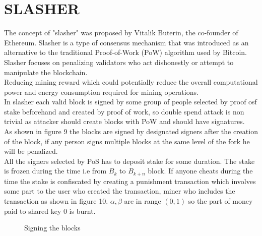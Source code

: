 \documentclass{article}
\begin{document}
\section{SLASHER}
The concept of "slasher" was proposed by Vitalik Buterin, the co-founder of Ethereum. Slasher is a type of consensus mechanism that was introduced as an alternative to the traditional Proof-of-Work (PoW) algorithm used by Bitcoin. Slasher focuses on penalizing validators who act dishonestly or attempt to manipulate the blockchain.\\
Reducing mining reward which could potentially reduce the overall computational power and energy consumption required for mining operations. \\
In slasher each valid block is signed by some group of people selected by proof osf stake beforehand and created by proof of work, so double spend attack is non trivial as attacker should create blocks with PoW and should have signatures. \\
As shown in figure 9 the blocks are signed by designated signers after the creation of the block, if any person signs multiple blocks at the same level of the fork he will be penalized. \\
All the signers selected by PoS has to deposit stake for some duration. The stake is frozen during the time i.e from $B_k$ to $B_{k+n}$ block. If anyone cheats during the time the stake is confiscated by creating a punishment transaction which involves some part to the user who created the transaction, miner who includes the transaction as shown in figure 10.
$\alpha, \beta$ are in range $(0,1)$ so the part of money paid to shared key 0 is burnt.
\begin{figure}
\centering
{}
\caption{Signing the blocks}
\end{figure}
\end{document}
